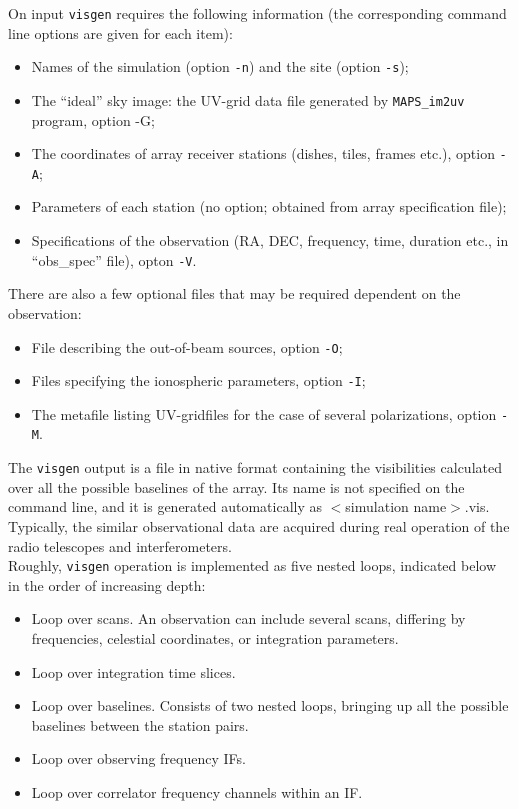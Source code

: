 \documentclass[letterpaper, oneside, 11pt]{article}
\begin{document}
On input {\tt visgen} requires the following information (the corresponding command line options are given for each item):
\begin{itemize}
 \item Names of the simulation (option {\tt-n}) and the site (option {\tt-s});
 \item The ``ideal'' sky image: the UV-grid data file generated by {\tt MAPS\_im2uv} program, option -G;
 \item The coordinates of array receiver stations (dishes, tiles, frames etc.), option {\tt-A};
 \item Parameters of each station (no option; obtained from array specification file);
 \item Specifications of the observation (RA, DEC, frequency, time, duration etc., in ``obs\_spec'' file), opton {\tt -V}. 
\end{itemize}
There are also a few optional files that may be required dependent on the observation:
\begin{itemize}
 \item File describing the out-of-beam sources, option {\tt-O};
 \item Files specifying the ionospheric parameters, option {\tt-I};
 \item The metafile listing UV-gridfiles for the case of several polarizations, option {\tt-M}.
\end{itemize}

The {\tt visgen} output is a file in native format containing the visibilities calculated over all the possible baselines of the array. Its name is not specified on the command line, and it is generated automatically as $<$simulation name$>$.vis. Typically, the similar observational data are acquired during real operation of the radio telescopes and interferometers.\\

Roughly, {\tt visgen} operation is implemented as five nested loops, indicated below in the order of increasing depth:
\begin{itemize}
 \item Loop over scans. An observation can include several scans, differing by frequencies, celestial coordinates, or integration parameters.
 \item Loop over integration time slices. 
 \item Loop over baselines. Consists of two nested loops, bringing up all the possible baselines between the station pairs.
 \item Loop over observing frequency IFs. 
 \item Loop over correlator frequency channels within an IF.
\end{itemize}
\end{document}
